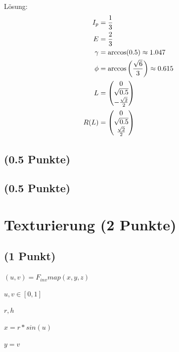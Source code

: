 \documentclass[a4paper,10pt,DIV=14]{article}
\begin{document}
Lösung:
\begin{align*}
I_p &= \frac{1}{3}\\
E &= \frac{2}{3} \\
\gamma &= \arccos(0.5) \approx 1.047\\
\phi &= \arccos\left(\frac{\sqrt{6}}{3}\right) \approx 0.615 \\
L &=  \begin{pmatrix} 0 \\ \sqrt{0.5} \\ -\frac{\sqrt{2}}{2} \end{pmatrix} \\
R(L) &= \begin{pmatrix} 0 \\ \sqrt{0.5} \\ \frac{\sqrt{2}}{2} \end{pmatrix}\\
\end{align*}

\subsection{(0.5 Punkte)} %
\subsection{(0.5 Punkte)}

\section{Texturierung (2 Punkte)} %

\subsection{(1 Punkt)} %



$(u,v) = F_{inv} map(x,y,z)$

$u,v \in [0,1]$

$r,h$

$x = r * sin(u)$

$y = v$
\end{document}
